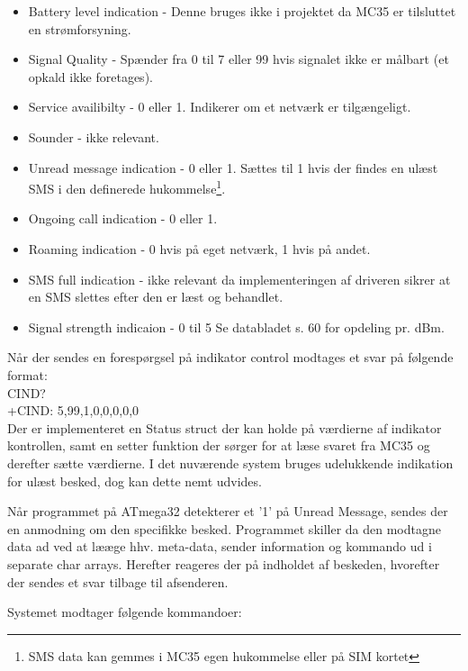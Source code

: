 \begin{itemize}
    \item Battery level indication - Denne bruges ikke i projektet da MC35 er tilsluttet en strømforsyning.
    \item Signal Quality - Spænder fra 0 til 7 eller 99 hvis signalet ikke er målbart (et opkald ikke foretages).
    \item Service availibilty - 0 eller 1. Indikerer om et netværk er tilgængeligt.
    \item Sounder  - ikke relevant.
    \item Unread message indication - 0 eller 1. Sættes til 1 hvis der findes en ulæst SMS i den 
    definerede hukommelse\footnote{SMS data kan gemmes i MC35 egen hukommelse eller på SIM kortet}.
    \item Ongoing call indication - 0 eller 1.
    \item Roaming indication - 0 hvis på eget netværk, 1 hvis på andet.
    \item SMS full indication - ikke relevant da implementeringen af driveren sikrer at en SMS slettes efter den er læst og behandlet.
    \item Signal strength indicaion - 0 til 5 Se databladet s. 60 for opdeling pr. dBm.
\end{itemize}

Når der sendes en forespørgsel på indikator control modtages et svar på følgende format:\\

	CIND?\\
	+CIND: 5,99,1,0,0,0,0,0\\

Der er implementeret en Status struct der kan holde på værdierne af indikator kontrollen, samt en setter funktion der sørger for at læse svaret fra MC35 og derefter sætte værdierne.
I det nuværende system bruges udelukkende indikation for ulæst besked, dog kan dette nemt udvides.

Når programmet på ATmega32 detekterer et '1' på Unread Message, sendes der en anmodning om den specifikke besked. Programmet skiller da den modtagne data ad ved at lææge hhv. meta-data, sender information og kommando 
ud i separate char arrays. Herefter reageres der på indholdet af beskeden, hvorefter der sendes et svar tilbage til afsenderen.

Systemet modtager følgende kommandoer:

